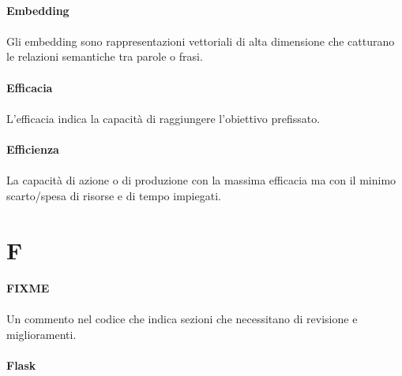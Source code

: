 \documentclass[10pt, a4paper]{article}
\begin{document}
\paragraph{Embedding}\noindent\hrulefill
\paragraph{}Gli embedding sono rappresentazioni vettoriali di alta dimensione che catturano le relazioni semantiche tra parole o frasi.

\vspace{2em}
\paragraph{Efficacia}\noindent\hrulefill
\paragraph{}L'efficacia indica la capacità di raggiungere l'obiettivo prefissato.

\vspace{2em}
\paragraph{Efficienza}\noindent\hrulefill
\paragraph{}La capacità di azione o di produzione con la massima efficacia ma con il minimo scarto/spesa di risorse e di tempo impiegati.

\newpage
\section{F}
\vspace{2em}
\paragraph{FIXME}\noindent\hrulefill
\paragraph{}Un commento nel codice che indica sezioni che necessitano di revisione e miglioramenti.


\vspace{2em}
\paragraph{Flask}\noindent\hrulefill
\end{document}
